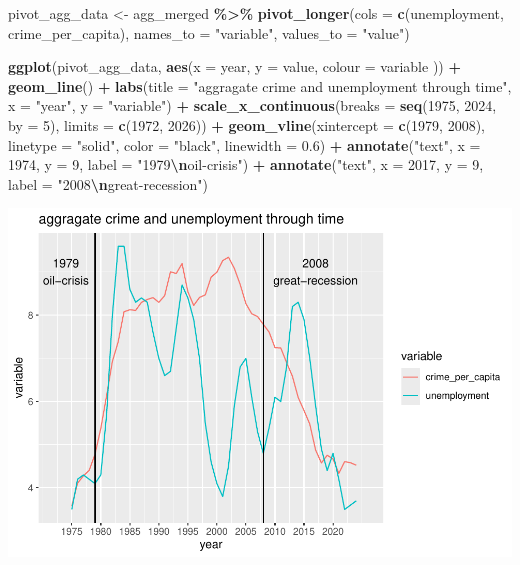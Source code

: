 \documentclass[
]{article}
\newenvironment{Shaded}{\begin{snugshade}}{\end{snugshade}}
\newcommand{\AttributeTok}[1]{\textcolor[rgb]{0.13,0.29,0.53}{#1}}
\newcommand{\DecValTok}[1]{\textcolor[rgb]{0.00,0.00,0.81}{#1}}
\newcommand{\FloatTok}[1]{\textcolor[rgb]{0.00,0.00,0.81}{#1}}
\newcommand{\FunctionTok}[1]{\textcolor[rgb]{0.13,0.29,0.53}{\textbf{#1}}}
\newcommand{\NormalTok}[1]{#1}
\newcommand{\OtherTok}[1]{\textcolor[rgb]{0.56,0.35,0.01}{#1}}
\newcommand{\SpecialCharTok}[1]{\textcolor[rgb]{0.81,0.36,0.00}{\textbf{#1}}}
\newcommand{\StringTok}[1]{\textcolor[rgb]{0.31,0.60,0.02}{#1}}
\begin{document}
\begin{Shaded}
\begin{Highlighting}[]
\NormalTok{pivot\_agg\_data }\OtherTok{\textless{}{-}}\NormalTok{ agg\_merged }\SpecialCharTok{\%\textgreater{}\%}
  \FunctionTok{pivot\_longer}\NormalTok{(}\AttributeTok{cols =} \FunctionTok{c}\NormalTok{(unemployment, crime\_per\_capita), }\AttributeTok{names\_to =} \StringTok{"variable"}\NormalTok{, }\AttributeTok{values\_to =} \StringTok{"value"}\NormalTok{)}

\FunctionTok{ggplot}\NormalTok{(pivot\_agg\_data, }\FunctionTok{aes}\NormalTok{(}\AttributeTok{x =}\NormalTok{ year, }\AttributeTok{y =}\NormalTok{ value, }\AttributeTok{colour =}\NormalTok{ variable )) }\SpecialCharTok{+}
  \FunctionTok{geom\_line}\NormalTok{() }\SpecialCharTok{+}
  \FunctionTok{labs}\NormalTok{(}\AttributeTok{title =} \StringTok{"aggragate crime and unemployment through time"}\NormalTok{, }\AttributeTok{x =} \StringTok{"year"}\NormalTok{, }\AttributeTok{y =} \StringTok{"variable"}\NormalTok{) }\SpecialCharTok{+}
  \FunctionTok{scale\_x\_continuous}\NormalTok{(}\AttributeTok{breaks =} \FunctionTok{seq}\NormalTok{(}\DecValTok{1975}\NormalTok{, }\DecValTok{2024}\NormalTok{, }\AttributeTok{by =} \DecValTok{5}\NormalTok{), }\AttributeTok{limits =} \FunctionTok{c}\NormalTok{(}\DecValTok{1972}\NormalTok{, }\DecValTok{2026}\NormalTok{)) }\SpecialCharTok{+}
  \FunctionTok{geom\_vline}\NormalTok{(}\AttributeTok{xintercept =} \FunctionTok{c}\NormalTok{(}\DecValTok{1979}\NormalTok{, }\DecValTok{2008}\NormalTok{), }
             \AttributeTok{linetype =} \StringTok{"solid"}\NormalTok{, }
             \AttributeTok{color =} \StringTok{"black"}\NormalTok{, }
             \AttributeTok{linewidth =} \FloatTok{0.6}\NormalTok{) }\SpecialCharTok{+} 
  \FunctionTok{annotate}\NormalTok{(}\StringTok{"text"}\NormalTok{, }\AttributeTok{x =} \DecValTok{1974}\NormalTok{, }\AttributeTok{y =} \DecValTok{9}\NormalTok{, }\AttributeTok{label =} \StringTok{"1979}\SpecialCharTok{\textbackslash{}n}\StringTok{oil{-}crisis"}\NormalTok{) }\SpecialCharTok{+}
  \FunctionTok{annotate}\NormalTok{(}\StringTok{"text"}\NormalTok{, }\AttributeTok{x =} \DecValTok{2017}\NormalTok{, }\AttributeTok{y =} \DecValTok{9}\NormalTok{, }\AttributeTok{label =} \StringTok{"2008}\SpecialCharTok{\textbackslash{}n}\StringTok{great{-}recession"}\NormalTok{)}
\end{Highlighting}
\end{Shaded}

\includegraphics[width=0.8\linewidth]{Template_Assignment_files/figure-latex/analysis-1}
\end{document}
